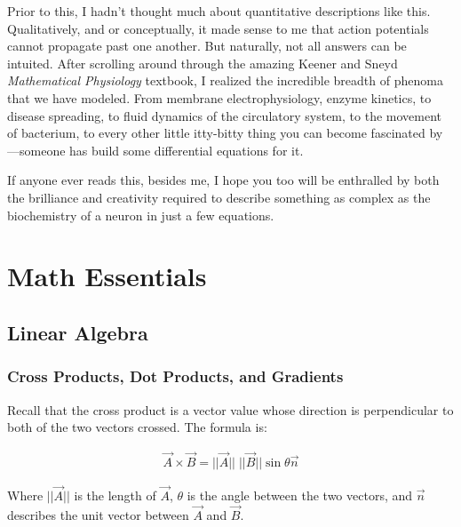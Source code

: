 Prior to this, I hadn't thought much about quantitative descriptions like this. Qualitatively, and or conceptually, it made sense to me that action potentials cannot propagate past one another. But naturally, not all answers can be intuited. After scrolling around through the amazing Keener and Sneyd \textit{Mathematical Physiology} textbook, I realized the incredible breadth of phenoma that we have modeled. From membrane electrophysiology, enzyme kinetics, to disease spreading, to fluid dynamics of the circulatory system, to the movement of bacterium, to every other little itty-bitty thing you can become fascinated by---someone has build some differential equations for it.\newline

If anyone ever reads this, besides me, I hope you too will be enthralled by both the brilliance and creativity required to describe something as complex as the biochemistry of a neuron in just a few equations. 



\chapter{Math Essentials}

\section{Linear Algebra}

\label{sec:linalg}

\subsection{Cross Products, Dot Products, and Gradients}

Recall that the cross product is a vector value whose direction is perpendicular to both of the two vectors crossed. The formula is:

\begin{equation} \label{crossproductformula}
\begin{split}
\vec{A} \times \vec{B} = ||\vec{A}|| \; ||\vec{B}|| \sin\theta \vec{n}
\end{split}
\end{equation}

Where $||\vec{A}||$ is the length of $\vec{A}$, $\theta$ is the angle between the two vectors, and $\vec{n}$ describes the unit vector between $\vec{A}$ and $\vec{B}$.\newline

